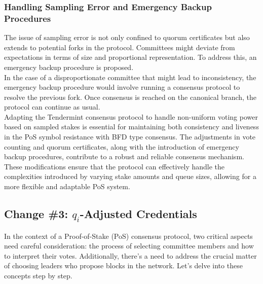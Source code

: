 \subsubsection{Handling Sampling Error and Emergency Backup Procedures}
The issue of sampling error is not only confined to quorum certificates but also extends to potential forks in the protocol. Committees might deviate from expectations in terms of size and proportional representation. To address this, an emergency backup procedure is proposed.\\
In the case of a disproportionate committee that might lead to inconsistency, the emergency backup procedure would involve running a consensus protocol to resolve the previous fork. Once consensus is reached on the canonical branch, the protocol can continue as usual.\\

Adapting the Tendermint consensus protocol to handle non-uniform voting power based on sampled stakes is essential for maintaining both consistency and liveness in the PoS symbol resistance with BFD type consensus. The adjustments in vote counting and quorum certificates, along with the introduction of emergency backup procedures, contribute to a robust and reliable consensus mechanism.\\
These modifications ensure that the protocol can effectively handle the complexities introduced by varying stake amounts and queue sizes, allowing for a more flexible and adaptable PoS system.

\subsection{Change \#3: $q_i$-Adjusted Credentials}
In the context of a Proof-of-Stake (PoS) consensus protocol, two critical aspects need careful consideration: the process of selecting committee members and how to interpret their votes. Additionally, there's a need to address the crucial matter of choosing leaders who propose blocks in the network. Let's delve into these concepts step by step.


